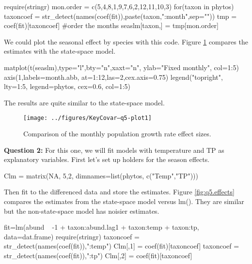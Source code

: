 \begin{Schunk}
\begin{Sinput}
 require(stringr)
 mon.order = c(5,4,8,1,9,7,6,2,12,11,10,3)
 for(taxon in phytos){
   taxoncoef = str_detect(names(coef(fit)),paste(taxon,":month",sep=""))
   tmp = coef(fit)[taxoncoef]
   #order the months
   seaslm[taxon,] = tmp[mon.order]
 }
\end{Sinput}
\end{Schunk}

We could plot the seasonal effect by species with this code. Figure \ref{fig:q5} compares the estimates with the state-space model.
\begin{Schunk}
\begin{Sinput}
 matplot(t(seaslm),type="l",bty="n",xaxt="n", ylab="Fixed monthly", col=1:5)
 axis(1,labels=month.abb, at=1:12,las=2,cex.axis=0.75)
 legend("topright", lty=1:5, legend=phytos, cex=0.6, col=1:5)
\end{Sinput}
\end{Schunk}

The results are quite similar to the state-space model.

\begin{figure}[htp]
\label{fig:q5}
\begin{center}
\texttt{[image: ../figures/KeyCovar--q5-plot1]}
\end{center}
\caption{Comparison of the monthly population growth rate effect sizes.}
\end{figure}

\bigskip
{\bf Question 2:} For this one, we will fit models with temperature and TP as explanatory variables.
First let's set up holders for the season effects.
\begin{Schunk}
\begin{Sinput}
 Clm = matrix(NA, 5,2, dimnames=list(phytos, c("Temp","TP")))
\end{Sinput}
\end{Schunk}

Then fit to the differenced data and store the estimates.  Figure \ref{fig:q5.effects} compares the estimates from the state-space model versus lm().  They are similar but the non-state-space model has noisier estimates.
\begin{Schunk}
\begin{Sinput}
   fit=lm(abund ~ -1 + taxon:abund.lag1 + taxon:temp + taxon:tp,
          data=dat.frame)
 require(stringr)
   taxoncoef = str_detect(names(coef(fit)),":temp")
   Clm[,1] = coef(fit)[taxoncoef]
   taxoncoef = str_detect(names(coef(fit)),":tp")
   Clm[,2] = coef(fit)[taxoncoef]
\end{Sinput}
\end{Schunk}

